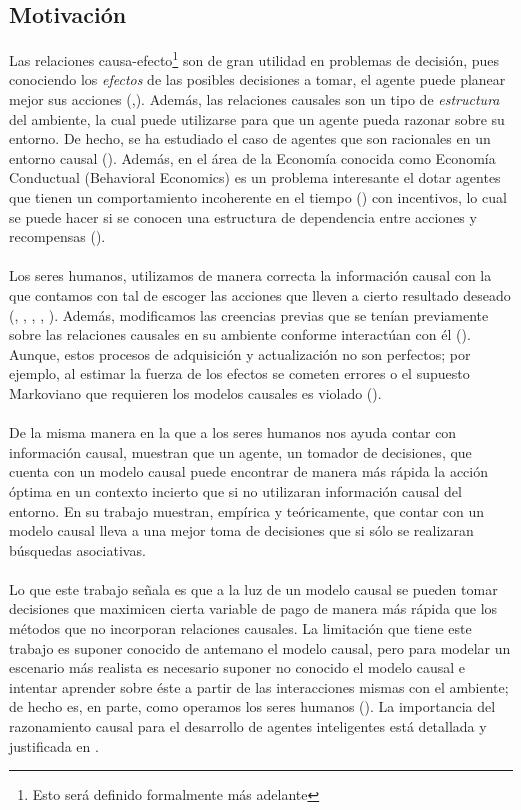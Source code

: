\documentclass[11pt]{article}
\theoremstyle{plain}
\begin{document}
\subsection{Motivación}
Las relaciones causa-efecto\footnote{Esto será definido formalmente más adelante} son de gran utilidad en problemas de decisión, pues conociendo los \textit{efectos} de las posibles decisiones a tomar, el agente puede planear mejor sus acciones (\cite{hagmayer2013repeated},\cite{pearlwhy}). Además, las relaciones causales son un tipo de \textit{estructura} del ambiente, la cual puede utilizarse para que un agente pueda razonar sobre su entorno. De hecho, se ha estudiado el caso de agentes que son racionales en un entorno causal (\cite{board2006equivalence}). Además, en el área de la Economía conocida como Economía Conductual (Behavioral Economics) es un problema interesante el dotar agentes que tienen un comportamiento incoherente en el tiempo (\cite{kleinberg2014time}) con incentivos, lo cual se puede hacer si se conocen una estructura de dependencia entre acciones y recompensas (\cite{albers2016motivating}). \\
\\
\indent Los seres humanos, utilizamos de manera correcta la información causal con la que contamos con tal de escoger las acciones que lleven a cierto resultado deseado (\cite{sloman2006causal}, \cite{nichols2007decision}, \cite{meder2010observing}, \cite{hagmayer2013repeated}, \cite{danks2014unifying}). Además, modificamos las creencias previas que se tenían previamente sobre las relaciones causales en su ambiente conforme interactúan con él (\cite{hagmayer2013repeated}). Aunque, estos procesos de adquisición y actualización no son perfectos; por ejemplo, al estimar la fuerza de los efectos se cometen errores o el supuesto Markoviano que requieren los modelos causales es violado (\cite{rottman2014reasoning}). \\
\\
\indent De la misma manera en la que a los seres humanos nos ayuda contar con información causal, \cite{lattimoreNIPS2016} muestran que un agente, un tomador de decisiones, que cuenta con un modelo causal puede encontrar de manera más rápida la acción óptima en un contexto incierto que si no utilizaran información causal del entorno. En su trabajo muestran, empírica y teóricamente, que contar con un modelo causal lleva a una mejor toma de decisiones que si sólo se realizaran búsquedas asociativas.\\
\\
\indent Lo que este trabajo señala es que a la luz de un modelo causal se pueden tomar decisiones que maximicen cierta variable de pago de manera más rápida que los métodos que no incorporan relaciones causales. La limitación que tiene este trabajo es suponer conocido de antemano el modelo causal, pero para modelar un escenario más realista es necesario suponer no conocido el modelo causal e intentar aprender sobre éste a partir de las interacciones mismas con el ambiente; de hecho es, en parte, como operamos los seres humanos (\cite{hagmayer2013repeated}). La importancia del razonamiento causal para el desarrollo de agentes inteligentes está detallada y justificada en \cite{lake2017building}.\\
\end{document}

